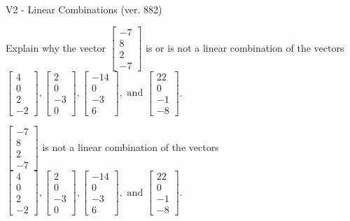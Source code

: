\begin{exercise}
  \begin{exerciseTitle}V2 - Linear Combinations (ver. 882)\end{exerciseTitle}
  \begin{exerciseStatement}
    Explain why the vector \(\left[\begin{array}{c}
-7 \\
8 \\
2 \\
-7
\end{array}\right]\)  is or is not a linear 
	combination of the vectors \(\left[\begin{array}{c}
4 \\
0 \\
2 \\
-2
\end{array}\right] , \left[\begin{array}{c}
2 \\
0 \\
-3 \\
0
\end{array}\right] , \left[\begin{array}{c}
-14 \\
0 \\
-3 \\
6
\end{array}\right] , \text{ and } \left[\begin{array}{c}
22 \\
0 \\
-1 \\
-8
\end{array}\right]\).
	


  \end{exerciseStatement}
  \begin{exerciseAnswer}
   \(\left[\begin{array}{c}
-7 \\
8 \\
2 \\
-7
\end{array}\right]\) 
  	 is not  
	a linear combination of the vectors \(\left[\begin{array}{c}
4 \\
0 \\
2 \\
-2
\end{array}\right] , \left[\begin{array}{c}
2 \\
0 \\
-3 \\
0
\end{array}\right] , \left[\begin{array}{c}
-14 \\
0 \\
-3 \\
6
\end{array}\right] , \text{ and } \left[\begin{array}{c}
22 \\
0 \\
-1 \\
-8
\end{array}\right]\).


\end{exerciseAnswer}
\end{exercise}
